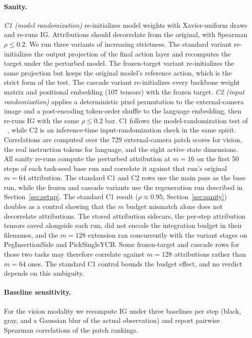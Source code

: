\documentclass{article}
\begin{document}
\paragraph{Sanity.}
\emph{C1 (model randomization)} re-initializes model weights with Xavier-uniform draws and re-runs IG.
Attributions should decorrelate from the original, with Spearman $\rho \leq 0.2$.
We run three variants of increasing strictness.
The standard variant re-initializes the output projection of the final action layer and recomputes the target under the perturbed model.
The frozen-target variant re-initializes the same projection but keeps the original model's reference action, which is the strict form of the test.
The cascade variant re-initializes every backbone weight matrix and positional embedding (107 tensors) with the frozen target.
\emph{C2 (input randomization)} applies a deterministic pixel permutation to the external-camera image and a post-encoding token-order shuffle to the language embedding, then re-runs IG with the same $\rho \leq 0.2$ bar.
C1 follows the model-randomization test of \citeauthor{adebayo2018sanity}~, while C2 is an inference-time input-randomization check in the same spirit.
Correlations are computed over the 729 external-camera patch scores for vision, the real instruction tokens for language, and the eight active state dimensions.
All sanity re-runs compute the perturbed attribution at $m{=}16$ on the first 50 steps of each task-seed base run and correlate it against that run's original $m{=}64$ attribution.
The standard C1 and C2 rows use the main pass as the base run, while the frozen and cascade variants use the regeneration run described in Section~\ref{sec:setup}.
The standard C1 result ($\rho \approx 0.95$, Section~\ref{sec:sanity}) doubles as a control showing that the $m$ budget mismatch alone does not decorrelate attributions.
The stored attribution sidecars, the per-step attribution tensors saved alongside each run, did not encode the integration budget in their filenames, and the $m{=}128$ extension ran concurrently with the variant stages on PegInsertionSide and PickSingleYCB.
Some frozen-target and cascade rows for those two tasks may therefore correlate against $m{=}128$ attributions rather than $m{=}64$ ones.
The standard C1 control bounds the budget effect, and no verdict depends on this ambiguity.

\paragraph{Baseline sensitivity.}
For the vision modality we recompute IG under three baselines per step (black, gray, and a Gaussian blur of the actual observation) and report pairwise Spearman correlations of the patch rankings.
\end{document}
